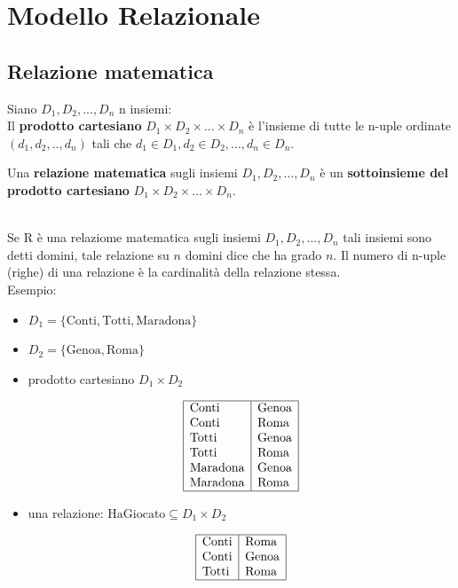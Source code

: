 \chapter{Modello Relazionale}
\section{Relazione matematica}
\colorbox{SALZO}{\parbox{\dimexpr\linewidth-2\fboxsep}{\begin{definition}
Siano $D_1,D_2,...,D_n$ n insiemi:\\
Il \textbf{prodotto cartesiano} $D_1 \times D_2 \times ... \times D_n$ è l'insieme di tutte le n-uple ordinate $(d_1,d_2,..,d_n)$ tali che $d_1 \in D_1, d_2 \in D_2 ,..., d_n \in D_n$. 
\end{definition}}}
\colorbox{SALZO}{\parbox{\dimexpr\linewidth-2\fboxsep}{\begin{definition}
Una \textbf{relazione matematica} sugli insiemi $D_1,D_2,...,D_n$ è un \textbf{sottoinsieme del prodotto cartesiano} $D_1 \times D_2 \times ... \times D_n$.
\end{definition}}}\medskip\\
Se R è una relaziome matematica sugli insiemi $D_1,D_2,...,D_n$ tali insiemi sono detti domini, tale relazione su $n$ domini dice che ha grado $n$. Il numero di n-uple (righe) di una relazione è la cardinalità della relazione stessa.\\
Esempio:
\begin{itemize}

    \item $D_1 = \{\text{Conti}, \text{Totti}, \text{Maradona}\}$

    \item $D_2 = \{\text{Genoa}, \text{Roma}\}$

    \item prodotto cartesiano $D_1 \times D_2$
    
    \[
    \begin{array}{|l|l|}
    \hline
    \text{Conti}    & \text{Genoa} \\
    \text{Conti}    & \text{Roma}  \\
    \text{Totti}    & \text{Genoa} \\
    \text{Totti}    & \text{Roma}  \\
    \text{Maradona} & \text{Genoa} \\
    \text{Maradona} & \text{Roma}  \\
    \hline
    \end{array}
    \]

    \item una relazione:
    $\text{HaGiocato} \subseteq D_1 \times D_2$

    \[
    \begin{array}{|l|l|}
    \hline
    \text{Conti} & \text{Roma}  \\
    \text{Conti} & \text{Genoa} \\
    \text{Totti} & \text{Roma}  \\
    \hline
    \end{array}
    \]

\end{itemize}

